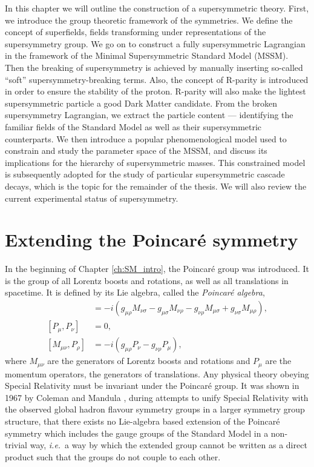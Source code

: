 \documentclass[twoside,english]{uiofysmaster}
\begin{document}
In this chapter we will outline the construction of a supersymmetric theory. First, we introduce the group theoretic framework of the symmetries. We define the concept of superfields, fields transforming under representations of the supersymmetry group. We go on to construct a fully supersymmetric Lagrangian in the framework of the Minimal Supersymmetric Standard Model (MSSM). Then the breaking of supersymmetry is achieved by manually inserting so-called ``soft'' supersymmetry-breaking terms. Also, the concept of R-parity is introduced in order to ensure the stability of the proton. R-parity will also make the lightest supersymmetric particle a good Dark Matter candidate. From the broken supersymmetry Lagrangian, we extract the particle content --- identifying the familiar fields of the Standard Model as well as their supersymmetric counterparts. We then introduce a popular phenomenological model used to constrain and study the parameter space of the MSSM, and discuss its implications for the hierarchy of supersymmetric masses. This constrained model is subsequently adopted for the study of particular supersymmetric cascade decays, which is the topic for the remainder of the thesis. We will also review the current experimental status of supersymmetry. 


\section{Extending the Poincar\'{e} symmetry}
In the beginning of Chapter \ref{ch:SM_intro}, the Poincar\'{e} group was introduced. It is the group of all Lorentz boosts and rotations, as well as all translations in spacetime. It is defined by its Lie algebra, called the {\it Poincar\'{e} algebra},
\begin{align}
	[M_{\mu\nu}, M_{\rho\sigma}] &= -i(g_{\mu\rho}M_{\nu\sigma} - g_{\mu\sigma}M_{\nu\rho} - g_{\nu\rho}M_{\mu\sigma} + g_{\nu\sigma}M_{\mu\rho}),\\
	[P_\mu, P_\nu] &= 0,\\
	[M_{\mu\nu}, P_\rho] &= -i(g_{\mu\rho}P_\nu - g_{\nu\rho}P_\mu),
\end{align}
where $M_{\mu\nu}$ are the generators of Lorentz boosts and rotations and $P_\mu$ are the momentum operators, the generators of translations. Any physical theory obeying Special Relativity must be invariant under the Poincar\'{e} group. It was shown in 1967 by Coleman and Mandula \cite{PhysRev.159.1251}, during attempts to unify Special Relativity with the observed global hadron flavour symmetry groups in a larger symmetry group structure, that there exists no Lie-algebra based extension of the Poincar\'{e} symmetry which includes the gauge groups of the Standard Model in a non-trivial way, {\it i.e.}\ a way by which the extended group cannot be written as a direct product such that the groups do not couple to each other.
\end{document}
